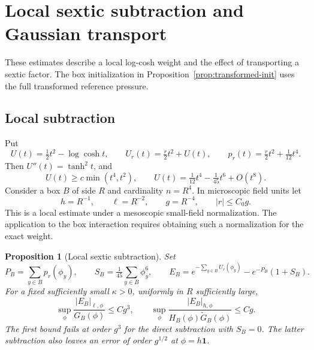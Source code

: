 \documentclass[11pt]{article}
\newtheorem{proposition}{Proposition}[section]
\begin{document}
\appendix
\section{Local sextic subtraction and Gaussian transport}
\label{app:box-sextic}
These estimates describe a local log-cosh weight and the effect
of transporting a sextic factor. The box initialization in
Proposition~\ref{prop:transformed-init} uses the full transformed
reference pressure.

\subsection{Local subtraction}

Put
\[
U(t)=\tfrac12t^2-\log\cosh t,\qquad
U_r(t)=\tfrac r2t^2+U(t),\qquad
p_r(t)=\tfrac r2t^2+\tfrac1{12}t^4.
\]
Then \(U''(t)=\tanh^2t\), and
\begin{equation}\label{eq:utaylor}
 U(t)\ge c\min(t^4,t^2),\qquad
 U(t)=\tfrac1{12}t^4-\tfrac1{45}t^6+O(t^8).
\end{equation}
Consider a box \(B\) of side \(R\) and cardinality \(n=R^4\). In microscopic field units let
\[
 h=R^{-1},\qquad \ell=R^{-2},\qquad g=R^{-4},
 \qquad |r|\le C_0g.
\]
This is a local estimate under a mesoscopic small-field normalization. The application to the box interaction requires obtaining such a normalization for the exact weight.

\begin{proposition}[Local sextic subtraction]\label{prop:local}
Set
\[
 P_B=\sum_{y\in B}p_r(\phi_y),\qquad
 S_B=\tfrac1{45}\sum_{y\in B}\phi_y^6,\qquad
 E_B=e^{-\sum_{y\in B}U_r(\phi_y)}-e^{-P_B}(1+S_B).
\]
For a fixed sufficiently small \(\kappa>0\), uniformly in \(R\) sufficiently large,
\begin{equation}\label{eq:norms}
 \sup_\phi\frac{|E_B|_{\ell,\phi}}{G_B(\phi)}
     \le Cg^3,
 \qquad
 \sup_\phi\frac{|E_B|_{h,\phi}}{H_B(\phi)\widetilde G_B(\phi)}
     \le Cg.
\end{equation}
The first bound fails at order \(g^3\) for the direct subtraction with \(S_B=0\). The latter subtraction also leaves an error of order \(g^{1/2}\) at \(\phi=h\mathbf 1\).
\end{proposition}
\end{document}
